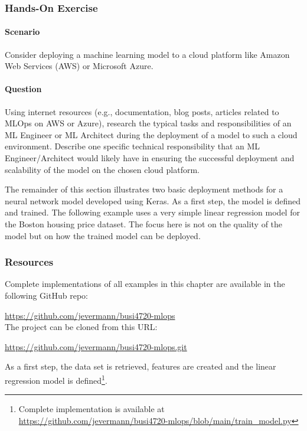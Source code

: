 \begin{tcolorbox}[colback=code]
\subsubsection*{Hands-On Exercise} 
\paragraph*{Scenario}
Consider deploying a machine learning model to a cloud platform like Amazon Web Services (AWS) or Microsoft Azure.

\paragraph*{Question}
Using internet resources (e.g., documentation, blog posts, articles related to MLOps on AWS or Azure), research the typical tasks and responsibilities of an ML Engineer or ML Architect during the deployment of a model to such a cloud environment. Describe one specific technical responsibility that an ML Engineer/Architect would likely have in ensuring the successful deployment and scalability of the model on the chosen cloud platform.
\end{tcolorbox}


The remainder of this section illustrates two basic deployment methods for a neural network model developed using Keras. As a first step, the model is defined and trained. The following example uses a very simple linear regression model for the Boston housing price dataset. The focus here is not on the quality of the model but on how the trained model can be deployed. 

\begin{tcolorbox}[colback=alert]
\subsubsection*{Resources}
Complete implementations of all examples in this chapter are available in the following GitHub repo:

\url{https://github.com/jevermann/busi4720-mlops} \\

The project can be cloned from this URL:

\url{https://github.com/jevermann/busi4720-mlops.git}
\end{tcolorbox}

As a first step, the data set is retrieved, features are created and the linear regression model is defined\footnote{
Complete implementation is available at \url{https://github.com/jevermann/busi4720-mlops/blob/main/train_model.py}}. \\

